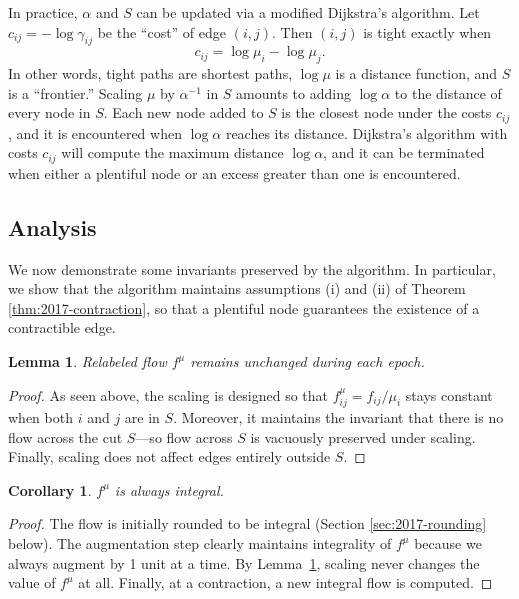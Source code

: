 \documentclass[11pt]{article}
\newtheorem{corollary}{Corollary}[theorem]
\newtheorem{lemma}[theorem]{Lemma}
\theoremstyle{definition}
\theoremstyle{definition}
\theoremstyle{definition}
\newcommand{\gij}{\gamma_{ij}}
\begin{document}
    In practice, $\alpha$ and $S$ can be updated via a modified Dijkstra's algorithm.
    Let $c_{ij} = - \log \gij$ be the ``cost'' of edge $(i, j)$.
    Then $(i, j)$ is tight exactly when
    \[ c_{ij} = \log \mu_i - \log \mu_j. \]
    In other words, tight paths are shortest paths, $\log \mu$ is a distance function,
    and $S$ is a ``frontier.'' Scaling $\mu$ by $\alpha^{-1}$ in $S$ amounts to adding
    $\log \alpha$ to the distance of every node in $S$. Each new node added to $S$
    is the closest node under the costs $c_{ij}$, and it is encountered when $\log \alpha$
    reaches its distance.
    Dijkstra's algorithm with costs $c_{ij}$ will compute the maximum distance $\log \alpha$,
    and it can be terminated when either a plentiful node or an excess greater than
    one is encountered.

	\subsection{Analysis}
	We now demonstrate some invariants preserved by the algorithm. In particular,
	we show that the algorithm maintains assumptions (i) and (ii) of
	Theorem \ref{thm:2017-contraction}, so that a plentiful node guarantees the
	existence of a contractible edge.
    \begin{lemma}
    Relabeled flow $f^{\mu}$ remains unchanged during each epoch.
    \label{lem:fsame}
    \end{lemma} 
    \begin{proof}
			As seen above, the scaling is designed so that $f_{ij}^\mu = f_{ij}/\mu_i$
			stays constant when both $i$ and $j$ are in $S$. Moreover, it maintains the
    	invariant that there is no flow across the cut $S$---so flow across $S$ is vacuously
    	preserved under scaling. Finally, scaling does not affect edges entirely
    	outside $S$.
    \end{proof}
    \begin{corollary}
    $f^{\mu}$ is always integral.
    \end{corollary}
    \begin{proof}
    The flow is initially rounded to be integral (Section \ref{sec:2017-rounding} below). 
    The augmentation step clearly maintains integrality of $f^{\mu}$ because we
    always augment by 1 unit at a time. By
    Lemma~\ref{lem:fsame}, scaling never changes the value of $f^{\mu}$ at all.
    Finally, at a contraction, a new integral flow is computed.
    \end{proof}
\end{document}
